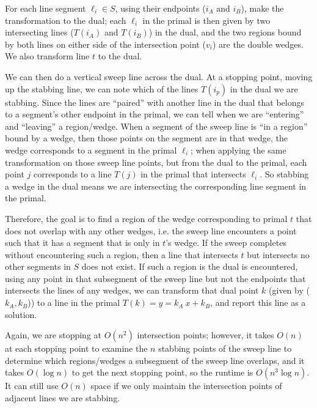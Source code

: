 \documentclass [12pt]{article}
\begin{document}
\begin{enumerate}[label=\alph*.]
        For each line segment $\ell_i \in S$, using their endpoints ($i_A$ and $i_B$), make the transformation to the dual; each $\ell_i $ in the primal is then given by two intersecting lines ($T(i_A)$ and $T(i_B)$) in the dual, and the two regions bound by both lines on either side of the intersection point ($v_i$) are the double wedges. We also transform line $t$ to the dual. 

        We can then do a vertical sweep line across the dual. At a stopping point, moving up the stabbing line, we can note which of the lines $T(i_p)$ in the dual we are stabbing. Since the lines are ``paired'' with another line in the dual that belongs to a segment's other endpoint in the primal, we can tell when we are ``entering'' and ``leaving'' a region/wedge. When a segment of the sweep line is ``in a region'' bound by a wedge, then those points on the segment are in that wedge, the wedge corresponds to a segment in the primal $\ell_i$; when applying the same transformation on those sweep line points, but from the dual to the primal, each point $j$ corresponds to a line $T(j)$ in the primal that intersects $\ell_i$. So stabbing a wedge in the dual means we are intersecting the corresponding line segment in the primal. 
        
        Therefore, the goal is to find a region of the wedge corresponding to primal $t$ that does not overlap with any other wedges, i.e. the sweep line encounters a point such that it has a segment that is only in $t$'s wedge. If the sweep completes without encountering such a region, then a line that intersects $t$ but intersects no other segments in $S$ does not exist. If such a region is the dual is encountered, using any point in that subsegment of the sweep line but not the endpoints that intersects the lines of any wedges, we can transform that dual point $k$ (given by ($k_A, k_B$)) to a line in the primal $T(k) = y = k_A\ x + k_B$, and report this line as a solution.

        Again, we are stopping at $O(n^2)$ intersection points; however, it takes $O(n)$ at each stopping point to examine the $n$ stabbing points of the sweep line to determine which regions/wedges a subsegment of the sweep line overlaps, and it takes $O(\log n)$ to get the next stopping point, so the runtime is $O(n^3 \log n)$. It can still use $O(n)$ space if we only maintain the intersection points of adjacent lines we are stabbing.
       
    \end{enumerate}
\end{document}
